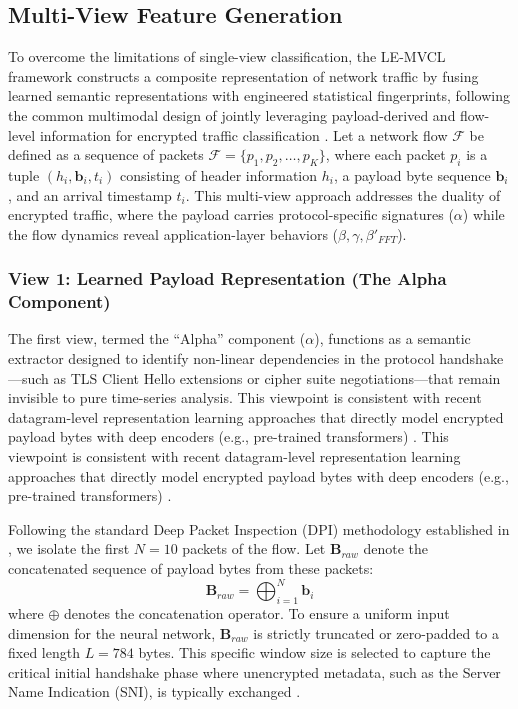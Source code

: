 
\subsection{Multi-View Feature Generation}
\label{subsec:feature_generation}

To overcome the limitations of single-view classification, the LE-MVCL framework constructs a composite representation of network traffic by fusing learned semantic representations with engineered statistical fingerprints, following the common multimodal design of jointly leveraging payload-derived and flow-level information for encrypted traffic classification \cite{zeng2019deep,chen2025mff}. Let a network flow $\mathcal{F}$ be defined as a sequence of packets $\mathcal{F} = \{p_1, p_2, \dots, p_K\}$, where each packet $p_i$ is a tuple $(h_i, \mathbf{b}_i, t_i)$ consisting of header information $h_i$, a payload byte sequence $\mathbf{b}_i$, and an arrival timestamp $t_i$. This multi-view approach addresses the duality of encrypted traffic, where the payload carries protocol-specific signatures ($\alpha$) while the flow dynamics reveal application-layer behaviors ($\beta, \gamma, \beta'_{FFT}$).

\subsubsection{View 1: Learned Payload Representation (The Alpha Component)}
\label{subsubsec:alpha_view}

The first view, termed the ``Alpha'' component ($\alpha$), functions as a semantic extractor designed to identify non-linear dependencies in the protocol handshake—such as TLS Client Hello extensions or cipher suite negotiations—that remain invisible to pure time-series analysis. This viewpoint is consistent with recent datagram-level representation learning approaches that directly model encrypted payload bytes with deep encoders (e.g., pre-trained transformers) \cite{lin2022etbert}. This viewpoint is consistent with recent datagram-level representation learning approaches that directly model encrypted payload bytes with deep encoders (e.g., pre-trained transformers) \cite{lin2022etbert}.

Following the standard Deep Packet Inspection (DPI) methodology established in \cite{lotfollahi2020deep}, we isolate the first $N=10$ packets of the flow. Let $\mathbf{B}_{raw}$ denote the concatenated sequence of payload bytes from these packets:
\begin{equation}
    \mathbf{B}_{raw} = \bigoplus_{i=1}^{N} \mathbf{b}_i
\end{equation}
where $\oplus$ denotes the concatenation operator. To ensure a uniform input dimension for the neural network, $\mathbf{B}_{raw}$ is strictly truncated or zero-padded to a fixed length $L=784$ bytes. This specific window size is selected to capture the critical initial handshake phase where unencrypted metadata, such as the Server Name Indication (SNI), is typically exchanged \cite{wang2017end} \cite{rfc6066}.

